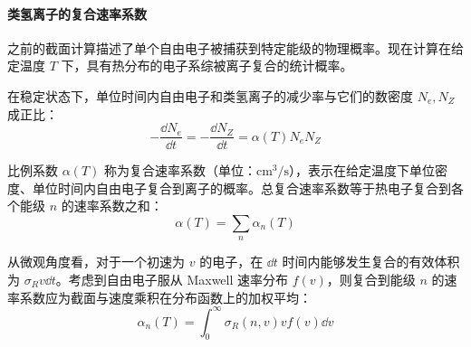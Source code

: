 \paragraph{类氢离子的复合速率系数}

之前的截面计算描述了单个自由电子被捕获到特定能级的物理概率。现在计算在给定温度 $T$ 下，具有热分布的电子系综被离子复合的统计概率。

在稳定状态下，单位时间内自由电子和类氢离子的减少率与它们的数密度 $N_e, N_Z$ 成正比：
\begin{equation}
    -\frac{\dd N_e}{\dd t} = -\frac{\dd N_Z}{\dd t} = \alpha(T) N_e N_Z
\end{equation}

比例系数 $\alpha(T)$ 称为复合速率系数（单位：$\text{cm}^3/\text{s}$），表示在给定温度下单位密度、单位时间内自由电子复合到离子的概率。总复合速率系数等于热电子复合到各个能级 $n$ 的速率系数之和：
\begin{equation}
    \alpha(T) = \sum_{n} \alpha_n(T)
\end{equation}

从微观角度看，对于一个初速为 $v$ 的电子，在 $\dd t$ 时间内能够发生复合的有效体积为 $\sigma_R v \dd t$。考虑到自由电子服从 Maxwell 速率分布 $f(v)$，则复合到能级 $n$ 的速率系数应为截面与速度乘积在分布函数上的加权平均：
\begin{equation}\label{eq:alpha_n_integral}
    \alpha_n(T) = \int_0^\infty \sigma_R(n, v) v f(v) \dd v
\end{equation}

